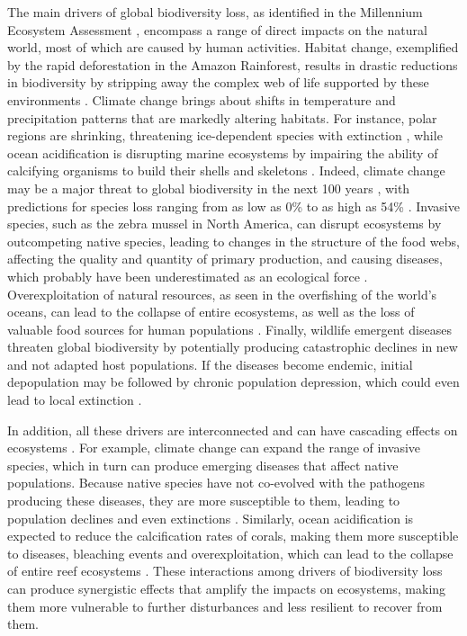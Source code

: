 The main drivers of global biodiversity loss, as identified in the Millennium
Ecosystem Assessment \cite{MEA2005}, encompass a range of
direct impacts on the natural world, most of which are caused by human
activities. Habitat change, exemplified by the rapid deforestation in the
Amazon Rainforest, results in drastic reductions in biodiversity by stripping
away the complex web of life supported by these environments
\cite{Laurance2012}. Climate change brings about shifts in temperature and
precipitation patterns that are markedly altering habitats. For instance, polar
regions are shrinking, threatening ice-dependent species with extinction
\cite{Post2013}, while ocean acidification is disrupting marine ecosystems by
impairing the ability of calcifying organisms to build their shells and
skeletons \cite{kroeker2013impacts}. Indeed, climate change may be a major
threat to global biodiversity in the next 100 years
\cite{Thomas2004,Loarie2009,Pimm2009,Warren2013,Warren2018}, with
predictions for species loss ranging from as low as 0\% to as high as 54\%
\cite{Urban2015}. Invasive species, such as the zebra mussel in North America,
can disrupt ecosystems by outcompeting native species, leading to changes in
the structure of the food webs, affecting the quality and quantity of primary
production, and causing diseases, which probably have been underestimated as an
ecological force \cite{Strayer2010}. Overexploitation of natural
resources, as seen in the overfishing of the world's oceans, can lead to the
collapse of entire ecosystems, as well as the loss of valuable food sources for
human populations \cite{Dayton1995,Coleman2002}. Finally, wildlife emergent
diseases threaten global biodiversity by potentially producing catastrophic
declines in new and not adapted host populations. If the diseases become
endemic, initial depopulation may be followed by chronic population depression,
which could even lead to local extinction \cite{Daszak2000}.


In addition, all these drivers are interconnected and can have cascading
effects
on ecosystems \cite{Mora2007}. For example, climate change can expand the range
of invasive species, which in turn can produce emerging diseases that affect
native populations. Because native species have not co-evolved with the
pathogens producing these diseases, they are more susceptible to them, leading
to population declines and even extinctions \cite{Daszak2000}. Similarly,
ocean acidification is expected to reduce the calcification rates of corals,
making them more susceptible to diseases, bleaching events and
overexploitation, which can lead to the collapse of entire reef ecosystems
\cite{Guldberg2007}. These interactions among drivers of biodiversity
loss can produce synergistic effects that amplify the impacts on ecosystems,
making them more vulnerable to further disturbances and less resilient to
recover from them.

